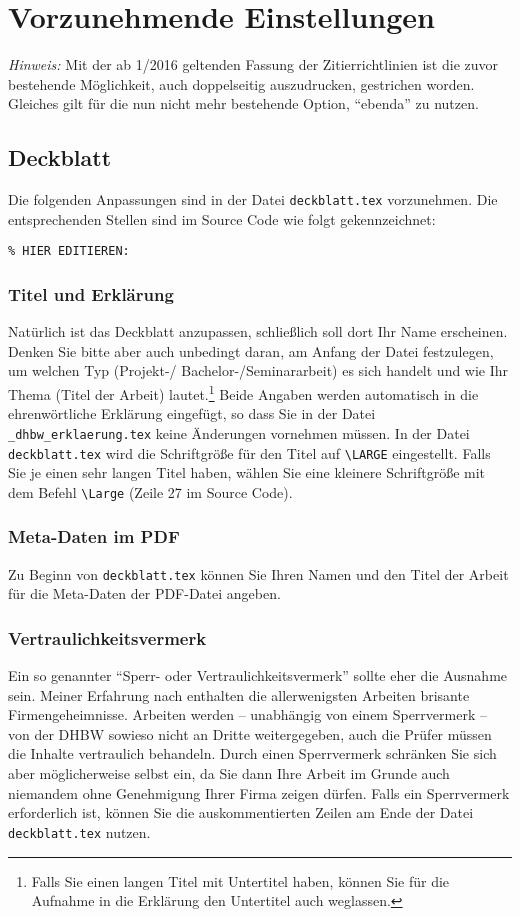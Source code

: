 \section{Vorzunehmende Einstellungen}

\emph{Hinweis:} Mit der ab 1/2016 geltenden Fassung der Zitierrichtlinien ist die zuvor bestehende Möglichkeit, auch doppelseitig auszudrucken, gestrichen worden. Gleiches gilt für die nun nicht mehr bestehende Option, \enquote{ebenda} zu nutzen.

\subsection{Deckblatt}

Die folgenden Anpassungen sind in der Datei \verb|deckblatt.tex| vorzunehmen. Die entsprechenden Stellen sind im Source Code wie folgt gekennzeichnet:
\lstset{language=TeX} 
\begin{lstlisting}
% HIER EDITIEREN: 
\end{lstlisting}

\subsubsection{Titel und Erklärung}
Natürlich ist das Deckblatt anzupassen, schließlich soll dort Ihr Name erscheinen. Denken Sie bitte aber auch unbedingt daran, am Anfang der Datei festzulegen, um welchen Typ (Projekt-/ Bachelor-/Seminararbeit) es sich handelt und wie Ihr Thema (Titel der Arbeit) lautet.\footnote{%
Falls Sie einen langen Titel mit Untertitel haben, können Sie für die Aufnahme in die Erklärung den Untertitel auch weglassen.} Beide Angaben werden automatisch in die ehrenwörtliche Erklärung eingefügt, so dass Sie in der Datei \verb|_dhbw_erklaerung.tex| keine Änderungen vornehmen müssen.
In der Datei \verb|deckblatt.tex| wird die Schriftgröße für den Titel auf \verb|\LARGE| eingestellt. Falls Sie je einen sehr langen Titel haben, wählen Sie eine kleinere Schriftgröße mit dem Befehl \verb|\Large| (Zeile 27 im Source Code).

\subsubsection{Meta-Daten im PDF}
Zu Beginn von \verb|deckblatt.tex| können Sie Ihren Namen und den Titel der Arbeit für die Meta-Daten der PDF-Datei angeben. 


\subsubsection{Vertraulichkeitsvermerk}
Ein so genannter \enquote{Sperr- oder Vertraulichkeitsvermerk} sollte eher die Ausnahme sein. Meiner Erfahrung nach enthalten die allerwenigsten Arbeiten brisante Firmengeheimnisse. Arbeiten werden -- unabhängig von einem Sperrvermerk -- von der DHBW sowieso nicht an Dritte weitergegeben, auch die Prüfer müssen die Inhalte vertraulich behandeln. Durch einen Sperrvermerk schränken Sie sich aber möglicherweise selbst ein, da Sie dann Ihre Arbeit im Grunde auch niemandem ohne Genehmigung Ihrer Firma zeigen dürfen.
Falls ein Sperrvermerk erforderlich ist, können Sie die auskommentierten Zeilen am Ende der Datei \verb|deckblatt.tex| nutzen.

